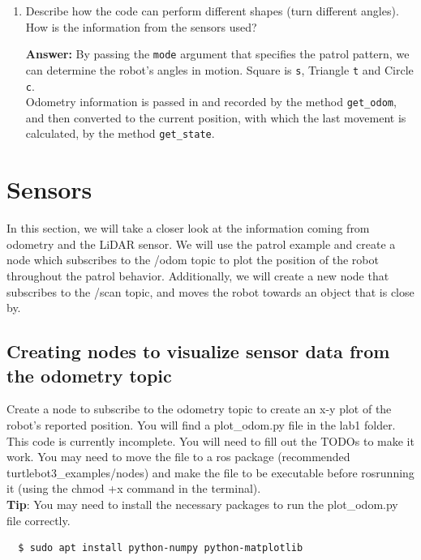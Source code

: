 \documentclass[12pt]{article}
\begin{document}
\begin{enumerate}
\begin{enumerate}
\begin{enumerate}
    \end{enumerate}

    \item Describe how the code can perform different shapes (turn different angles). How is the information from the sensors used?
    
    \textbf{Answer: }By passing the \texttt{mode} argument that specifies the patrol pattern, we can determine the robot's angles in motion. Square is \texttt{s}, Triangle \texttt{t} and Circle \texttt{c}.
    \\Odometry information is passed in and recorded by the method \texttt{get_odom}, and then converted to the current position, with which the last movement is calculated, by the method \texttt{get_state}.
  
  \end{enumerate}

\end{enumerate}

\section{Sensors}
In this section, we will take a closer look at the information coming from odometry and the LiDAR sensor. We will use the patrol example and create a node which subscribes to the /odom topic to plot the position of the robot throughout the patrol behavior. Additionally, we will create a new node that subscribes to the /scan topic, and moves the robot towards an object that is close by.

\subsection{Creating nodes to visualize sensor data from the odometry topic}

Create a node to subscribe to the odometry topic to create an x-y plot of the robot’s reported position. You will find a plot\_odom.py file in the lab1 folder. This code is currently incomplete. You will need to fill out the TODOs to make it work. You may need to move the file to a ros package (recommended turtlebot3\_examples/nodes) and make the file to be executable before rosrunning it (using the chmod +x command in the terminal). 
\\
\textbf{Tip}: You may need to install the necessary packages to run the plot\_odom.py file correctly.

\begin{verbatim}
  $ sudo apt install python-numpy python-matplotlib
\end{verbatim}
\end{document}
